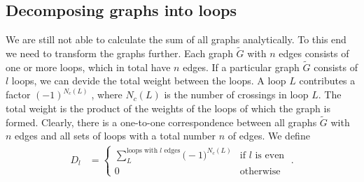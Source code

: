 \subsection{Decomposing graphs into loops}
%
We are still not able to calculate the sum of all graphs analytically.
To this end we need to transform the graphs further.
Each graph $\tilde G$ with $n$ edges consists of  one or more loops,
which in total have $n$ edges. If a particular graph $\tilde G$ consists of $l$ loops,
we can devide the total weight between the loops. A loop $L$ contributes
a factor
%
$(-1)^{N_{c}(L)}\;$,
%
where $N_{c}(L)$ is the number of crossings in loop $L$.
The total weight is the product of the weights of the loops of  which the graph is formed.
Clearly, there is a one-to-one correspondence between all graphs $\tilde G$
with $n$ edges and all sets of loops with a total number $n$ of edges.
We define 
%
\begin{align}\label{eq:ising:def:D}
D_{l} &=
\begin{cases}
 \sum_{L}^{\text{loops with $l$ edges}}  \big( -1 \big)^{N_{c}(L)}&\text{if $l$ is even}	\\
 0&\text{otherwise}
\end{cases}\;.
\end{align}
%

